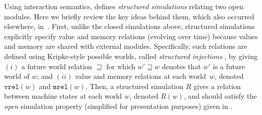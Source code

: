 Using interaction semantics, \ccc{} defines \emph{structured
  simulations} relating two open modules.
Here we briefly review the key ideas behind them,
which also occurred elsewhere, \eg in~\cite{pb,neis:pilsner,PLDI15}. 
First, unlike the closed simulations above,
structured simulations explicitly specify value and memory relations
(evolving over time) because values and memory are shared with external modules.
Specifically, such relations are defined using Kripke-style possible worlds,
called \emph{structured injections} ,
by giving $(i)$ a future world relation $\sqsupseteq$ for which
$w' \sqsupseteq w$ denotes that $w'$ is a future world of $w$;
and $(ii)$ value and memory relations at each world~$w$, denoted
$\mathtt{vrel}(w)$ and $\mathtt{mrel}(w)$.  Then, a
structured simulation $R$ gives a relation between machine
states at each world $w$, denoted $R(w)$, and should satisfy the
\emph{open} simulation property (simplified for presentation purposes) given in .
